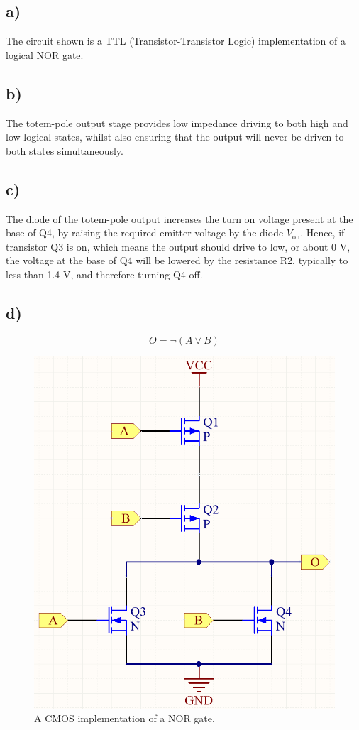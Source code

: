 \subsection*{a)}
	The circuit shown is a TTL (Transistor-Transistor Logic) implementation of a logical NOR gate.
\subsection*{b)}
	The totem-pole output stage provides low impedance driving to both high and low logical states, whilst also ensuring that the output will never be driven to both states simultaneously.
\subsection*{c)}
	The diode of the totem-pole output increases the turn on voltage present at the base of Q4, by raising the required emitter voltage by the diode $V_\mathrm{on}$. Hence, if transistor Q3 is on, which means the output should drive to low, or about 0 V, the voltage at the base of Q4 will be lowered by the resistance R2, typically to less than 1.4 V, and therefore turning Q4 off.
\subsection*{d)}
	$$ O = \lnot(A \lor B) $$
	\begin{figure}[htbp!]
		\centering
		\includegraphics[height=0.4\textheight]{img/nor_gate}
		\caption{A CMOS implementation of a NOR gate.}
	\end{figure}